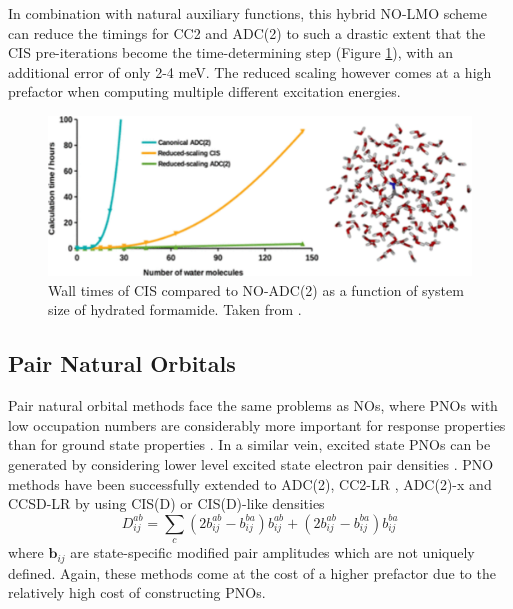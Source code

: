In combination with natural auxiliary functions, this hybrid NO-LMO scheme can reduce the timings for CC2 and ADC(2) to such a drastic extent that the CIS pre-iterations become the time-determining step (Figure \ref{fig:MESTER}), with an additional error of only 2-4 meV. The reduced scaling however comes at a high prefactor when computing multiple different excitation energies. 

\begin{figure}
\centering
\includegraphics[scale=1.0]{Pics/mester_adc.png}
\caption{Wall times of CIS compared to NO-ADC(2) as a function of system size of hydrated formamide. Taken from \cite{Mes2019}.}
\label{fig:MESTER}
\end{figure}


\subsection{Pair Natural Orbitals}

Pair natural orbital methods face the same problems as NOs, where PNOs with low occupation numbers are considerably more important for response properties than for ground state properties \cite{Har2016}. In a similar vein, excited state PNOs can be generated by considering lower level excited state electron pair densities \cite{Hel2011}. PNO methods have been successfully extended to ADC(2), CC2-LR \cite{Hel2013}, ADC(2)-x \cite{Hel2014} and CCSD-LR \cite{Fra2018} by using CIS(D) or CIS(D)-like densities
\begin{equation}
D_{ij}^{ab} = \sum_c \left( 2b_{ij}^{ab} - b_{ij}^{ba} \right) b_{ij}^{ab} + \left( 2b_{ij}^{ab} - b_{ij}^{ba} \right) b_{ij}^{ba}
\end{equation}
\noindent where $\mathbf{b}_{ij}$ are state-specific modified pair amplitudes which are not uniquely defined. Again, these methods come at the cost of a higher prefactor due to the relatively high cost of constructing PNOs. %

